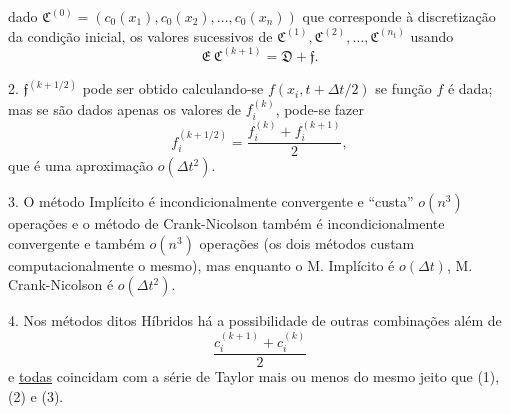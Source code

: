 dado $\mathfrak{C}^{(0)} = (c_0(x_1), c_0(x_2), \ldots, c_0(x_n))$ que corresponde à discretização da condição inicial, os valores sucessivos de $\mathfrak{C}^{(1)}, \mathfrak{C}^{(2)}, \ldots, \mathfrak{C}^{(n_t)}$ usando
$$\mathfrak{E} ~ \mathfrak{C}^{(k+1)} = \mathfrak{D} + \mathfrak{f}.$$

2. $\mathfrak{f}^{(k+1/2)}$ pode ser obtido calculando-se $f(x_i, t + \Delta t/2)$ se função $f$ é dada; mas se são dados apenas os valores de $f_i^{(k)}$, pode-se fazer
$$f_i^{(k+1/2)} = \dfrac{f_i^{(k)} + f_i^{(k+1)}}{2},$$
que é uma aproximação $o(\Delta t^{2})$.

3. O método Implícito é incondicionalmente convergente e ``custa'' $o(n^{3})$ operações e o método de Crank-Nicolson também é incondicionalmente convergente e também $o(n^{3})$ operações (os dois métodos custam computacionalmente o mesmo), mas enquanto o M. Implícito é $o(\Delta t)$, M. Crank-Nicolson é $o(\Delta t^{2})$.

4. Nos métodos ditos Híbridos há a possibilidade de outras combinações além de $$\dfrac{c_i^{(k+1)} + c_i^{(k)}}{2}$$
e \underline{todas} coincidam com a série de Taylor mais ou menos do mesmo jeito que (1), (2) e (3).